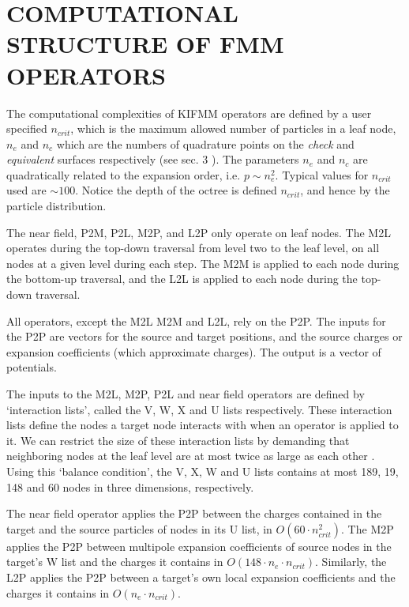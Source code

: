 \documentclass{IEEEcsmag}
\begin{document}
\section{COMPUTATIONAL STRUCTURE OF FMM OPERATORS}

The computational complexities of KIFMM operators are defined by a user specified $n_{crit}$, which is the maximum allowed number of particles in a leaf node, $n_e$ and $n_c$ which are the numbers of quadrature points on the \textit{check} and \textit{equivalent} surfaces respectively (see sec. 3 \cite{Ying2004}). The parameters $n_e$ and $n_c$ are quadratically related to the expansion order, i.e. $p \sim n_e^2$. Typical values for $n_{crit}$ used are $\sim 100$. Notice the depth of the octree is defined $n_{crit}$, and hence by the particle distribution.

The near field, P2M, P2L, M2P, and L2P only operate on leaf nodes. The M2L operates during the top-down traversal from level two to the leaf level, on all nodes at a given level during each step. The M2M is applied to each node during the bottom-up traversal, and the L2L is applied to each node during the top-down traversal.

All operators, except the M2L M2M and L2L, rely on the P2P. The inputs for the P2P are vectors for the source and target positions, and the source charges or expansion coefficients (which approximate charges). The output is a vector of potentials.

The inputs to the M2L, M2P, P2L and near field operators are defined by `interaction lists', called the V, W, X and U lists respectively. These interaction lists define the nodes a target node interacts with when an operator is applied to it. We can restrict the size of these interaction lists by demanding that neighboring nodes at the leaf level are at most twice as large as each other \cite{Sundar2007}. Using this `balance condition', the V, X, W and U lists contains at most 189, 19, 148 and 60 nodes in three dimensions, respectively.

The near field operator applies the P2P between the charges contained in the target and the source particles of nodes in its U list, in $O(60 \cdot n_{crit}^2)$. The M2P applies the P2P between multipole expansion coefficients of source nodes in the target's W list and the charges it contains in $O(148 \cdot n_e \cdot n_{crit})$. Similarly, the L2P applies the P2P between a target's own local expansion coefficients and the charges it contains in $O(n_e \cdot n_{crit})$.
\end{document}
